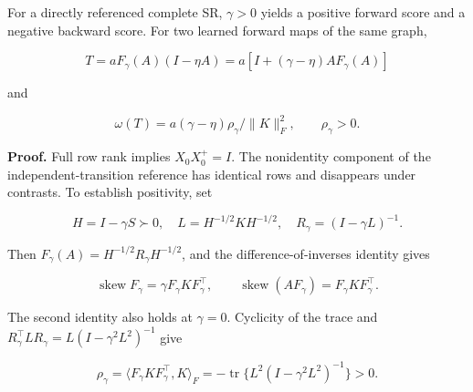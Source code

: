 \documentclass[11pt,a4paper]{article}
\begin{document}
\par
\noindent\begin{minipage}{\linewidth}

For a directly referenced complete SR, \(\gamma>0\) yields a positive
forward score and a negative backward score. For two learned forward
maps of the same graph,

\[
T=aF_\gamma(A)(I-\eta A)
=a[I+(\gamma-\eta)AF_\gamma(A)]
\]

\end{minipage}\par

\par
\noindent\begin{minipage}{\linewidth}

and

\[
\omega(T)=a(\gamma-\eta)\rho_\gamma/\|K\|_F^2,
\qquad \rho_\gamma>0.
\]

\end{minipage}\par

\par
\noindent\begin{minipage}{\linewidth}

\textbf{Proof.} Full row rank implies \(X_0X_0^+=I\). The nonidentity
component of the independent-transition reference has identical rows and
disappears under contrasts. To establish positivity, set

\[
H=I-\gamma S\succ0,\quad
L=H^{-1/2}KH^{-1/2},\quad R_\gamma=(I-\gamma L)^{-1}.
\]

\end{minipage}\par

\par
\noindent\begin{minipage}{\linewidth}

Then \(F_\gamma(A)=H^{-1/2}R_\gamma H^{-1/2}\), and the
difference-of-inverses identity gives

\[
\operatorname{skew}F_\gamma=\gamma F_\gamma K F_\gamma^\top,
\qquad
\operatorname{skew}(AF_\gamma)=F_\gamma K F_\gamma^\top.
\]

\end{minipage}\par

\par
\noindent\begin{minipage}{\linewidth}

The second identity also holds at \(\gamma=0\). Cyclicity of the trace
and \(R_\gamma^\top L R_\gamma=L(I-\gamma^2L^2)^{-1}\) give

\[
\rho_\gamma
=\langle F_\gamma K F_\gamma^\top,K\rangle_F
=-\operatorname{tr}\{L^2(I-\gamma^2L^2)^{-1}\}>0.
\]

\end{minipage}\par
\end{document}
